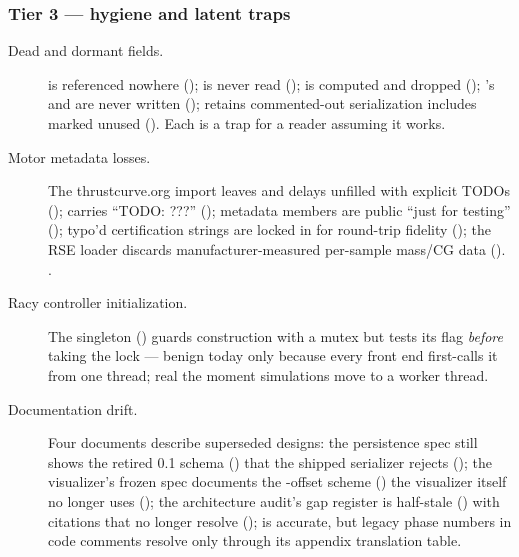 \subsubsection*{Tier 3 --- hygiene and latent traps}

\begin{description}

  \item[Dead and dormant fields.]  is referenced nowhere
  ();  is never read ();
   is computed and dropped ();
  's  and  are never written
  ();  retains commented-out serialization includes
  marked unused (). Each is a trap for a reader assuming it works.

  \item[Motor metadata losses.] The thrustcurve.org import leaves  and delays
  unfilled with explicit TODOs ();  carries
  ``TODO: ???'' (); metadata members are public ``just for testing''
  (); typo'd certification strings are locked in for round-trip
  fidelity (); the RSE loader discards manufacturer-measured
  per-sample mass/CG data (). .

  \item[Racy controller initialization.] The  singleton ()
  guards construction with a mutex but tests its  flag \emph{before} taking the
  lock --- benign today only because every front end first-calls it from one thread; real the
  moment simulations move to a worker thread.

  \item[Documentation drift.] Four documents describe superseded designs: the persistence spec
  still shows the retired 0.1  schema
  () that the shipped serializer rejects
  (); the visualizer's frozen spec documents the
  -offset scheme () the visualizer itself no longer uses
  (); the architecture audit's gap register is half-stale
  () with citations that no longer resolve
  ();  is accurate, but legacy phase numbers in
  code comments resolve only through its appendix translation table.


\end{description}
